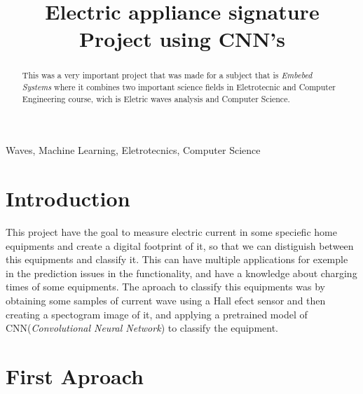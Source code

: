 \documentclass[conference]{IEEEtran}
\begin{document}
\title{Electric appliance signature Project using CNN's}


\author{
\and
{}
}

\maketitle

\begin{abstract}
This was a very important project that was made for a subject that is {\it Embebed Systems\/} where it combines two important science fields in Eletrotecnic and Computer Engineering course, wich is Eletric waves analysis and Computer Science.
\end{abstract}

\begin{IEEEkeywords}
Waves, Machine Learning, Eletrotecnics, Computer Science
\end{IEEEkeywords}

\section{Introduction}
This project have the goal to measure electric current in some speciefic home equipments and create a digital footprint of it, so that we can distiguish between this equipments and classify it. This can have multiple applications for exemple in the prediction issues in the functionality, and have a knowledge about charging times of some equipments.
The aproach to classify this equipments was by obtaining some samples of current wave using a Hall efect sensor and then creating a spectogram image of it, and applying a pretrained model of CNN({\it Convolutional Neural Network}) to classify the equipment.


\section{First Aproach}
\end{document}
